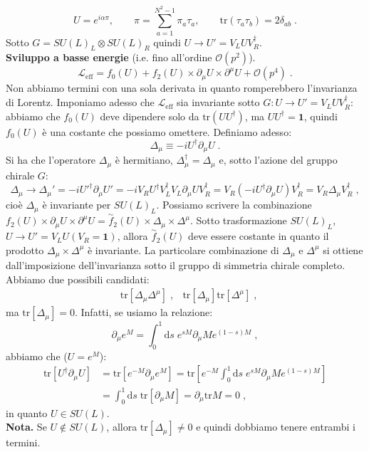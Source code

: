 \documentclass[12pt,a4paper]{article}
\theoremstyle{definition}
\newcommand{\lag}{\mathcal{L}}
\newcommand{\diff}[1][]{\mathrm{d}#1}
\newcommand{\adj}[1]{#1^{\dagger}}
\newcommand{\tr}{\mathrm{tr}}
\numberwithin{equation}{section}
\begin{document}
\begin{equation}
U=e^{i\alpha\pi},\qquad \pi=\sum_{a=1}^{N^2-1}\pi_a\tau_a,\qquad \tr(\tau_a\tau_b)=2\delta_{ab}\;.
\end{equation}
Sotto $G=SU(L)_L\otimes SU(L)_R$ quindi $U\to U'=V_LU\adj{V}_R$.
\\
\textbf{Sviluppo a basse energie} (i.e. fino all'ordine $\mathcal{O}(p^2)$). \\
\begin{equation}
\lag_{\mathrm{eff}}=f_0(U)+f_2(U)\times \partial_{\mu}U\times\partial^{\mu}U+\mathcal{O}(p^4)\;.
\end{equation}
Non abbiamo termini con una sola derivata in quanto romperebbero l'invarianza di Lorentz. Imponiamo adesso che $\lag_{\mathrm{eff}}$ sia invariante sotto $G:U\to U'=V_LU\adj{V}_R$: abbiamo che $f_0(U)$ deve dipendere solo da $\tr(U\adj{U})$, ma $U\adj{U}=\mathbf{1}$, quindi $f_0(U)$ è una costante che possiamo omettere. Definiamo adesso:
\begin{equation}
\Delta_{\mu}\equiv -i\adj{U}\partial_{\mu}U\;.
\end{equation}
Si ha che l'operatore $\Delta_{\mu}$ è hermitiano, $\adj{\Delta}_{\mu}=\Delta_{\mu}$ e, sotto l'azione del gruppo chirale $G$:
\begin{equation}
\Delta_{\mu}\to \Delta_{\mu}'=-i\adj{U'}\partial_{\mu}U'=-iV_R\adj{U}\adj{V}_LV_L\partial_{\mu}U\adj{V}_R=V_R(-i\adj{U}\partial_{\mu}U)\adj{V}_R=V_R\Delta_{\mu}\adj{V}_R\;,
\end{equation}
cioè $\Delta_{\mu}$ è invariante per $SU(L)_L$. Possiamo scrivere la combinazione $f_2(U)\times\partial_{\mu}U\times \partial^{\mu}U=\stackrel{\sim}{f}_2(U)\times\Delta_{\mu}\times\Delta^{\mu}$. Sotto trasformazione $SU(L)_L$, $U\to U'=V_LU (V_R=\mathbf{1})$, allora $\stackrel{\sim}{f}_2(U)$ deve essere costante in quanto il prodotto $\Delta_{\mu}\times\Delta^{\mu}$ è invariante. La particolare combinazione di $\Delta_{\mu}$ e $\Delta^{\mu}$ si ottiene dall'imposizione dell'invarianza sotto il gruppo di simmetria chirale completo. Abbiamo due possibili candidati:
\begin{align*}
&\tr[\Delta_{\mu}\Delta^{\mu}]\;, &\tr[\Delta_{\mu}]\tr[\Delta^{\mu}]\;,
\end{align*}
ma $\tr[\Delta_{\mu}]=0$. Infatti, se usiamo la relazione:
\begin{equation}
\partial_{\mu}e^M=\int_0^1\diff{s}\; e^{sM}\partial_{\mu}M e^{(1-s)M}\;,
\end{equation}
abbiamo che ($U=e^M$):
\begin{align*}
\tr[\adj{U}\partial_{\mu}U]&=\tr[e^{-M}\partial_{\mu}e^M]=\tr\left[e^{-M}\int_0^1\diff{s}\;e^{sM}\partial_{\mu}Me^{(1-s)M}\right] \\
&=\int_0^1\diff{s}\;\tr[\partial_{\mu}M]=\partial_{\mu}\tr M=0\;,
\end{align*}
in quanto $U\in SU(L)$. 
\\
\textbf{Nota.} Se $U\not\in SU(L)$, allora $\tr[\Delta_{\mu}]\ne 0$ e quindi dobbiamo tenere entrambi i termini. \\
\end{document}
